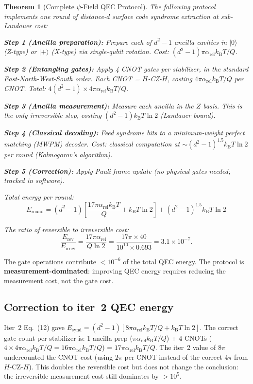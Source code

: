 \documentclass[11pt]{article}
\newtheorem{theorem}{Theorem}[section]
\theoremstyle{definition}
\theoremstyle{remark}
\newcommand{\kB}{k_{\mathrm{B}}}
\newcommand{\arel}{\alpha_{\mathrm{rel}}}
\begin{document}
\begin{theorem}[Complete $\psi$-Field QEC Protocol]
\label{thm:qec-protocol}
The following protocol implements one round of distance-$d$ surface code
syndrome extraction at sub-Landauer cost:

\textbf{Step 1 (Ancilla preparation):} Prepare each of $d^2-1$ ancilla
cavities in $|0\rangle$ (Z-type) or $|+\rangle$ (X-type) via
single-qubit rotation. Cost: $(d^2-1)\pi\arel\kB T/Q$.

\textbf{Step 2 (Entangling gates):} Apply 4 CNOT gates per stabilizer,
in the standard East-North-West-South order. Each CNOT = $H$-CZ-$H$,
costing $4\pi\arel\kB T/Q$ per CNOT. Total: $4(d^2-1)\times4\pi\arel\kB T/Q$.

\textbf{Step 3 (Ancilla measurement):} Measure each ancilla in the
$Z$ basis. This is the \emph{only irreversible step}, costing
$(d^2-1)\kB T\ln2$ (Landauer bound).

\textbf{Step 4 (Classical decoding):} Feed syndrome bits to a
minimum-weight perfect matching (MWPM) decoder. Cost: classical computation
at $\sim(d^2-1)^{1.5}\kB T\ln2$ per round (Kolmogorov's algorithm).

\textbf{Step 5 (Correction):} Apply Pauli frame update (no physical
gates needed; tracked in software).

Total energy per round:
\begin{equation}
\boxed{
E_{\mathrm{round}} = (d^2-1)\left[\frac{17\pi\arel\kB T}{Q} + \kB T\ln2\right]
+ (d^2-1)^{1.5}\kB T\ln2
}
\label{eq:qec-round}
\end{equation}

The ratio of reversible to irreversible cost:
\begin{equation}
\frac{E_{\mathrm{rev}}}{E_{\mathrm{irrev}}} = \frac{17\pi\arel}{Q\ln2}
= \frac{17\pi\times40}{10^{10}\times0.693}
= 3.1\times10^{-7}.
\label{eq:rev-irrev-ratio}
\end{equation}
\end{theorem}

The gate operations contribute $< 10^{-6}$ of the total QEC energy.
The protocol is \textbf{measurement-dominated}: improving QEC energy
requires reducing the measurement cost, not the gate cost.

\subsection{Correction to iter~2 QEC energy}

Iter~2 Eq.~(12) gave $E_{\mathrm{synd}} = (d^2-1)[8\pi\arel\kB T/Q + \kB T\ln2]$.
The correct gate count per stabilizer is: 1 ancilla prep ($\pi\arel\kB T/Q$)
+ 4 CNOTs ($4\times4\pi\arel\kB T/Q = 16\pi\arel\kB T/Q$) = $17\pi\arel\kB T/Q$.
The iter~2 value of $8\pi$ undercounted the CNOT cost (using $2\pi$ per
CNOT instead of the correct $4\pi$ from $H$-CZ-$H$). This doubles the
reversible cost but does not change the conclusion: the irreversible
measurement cost still dominates by $>10^5$.
\end{document}
